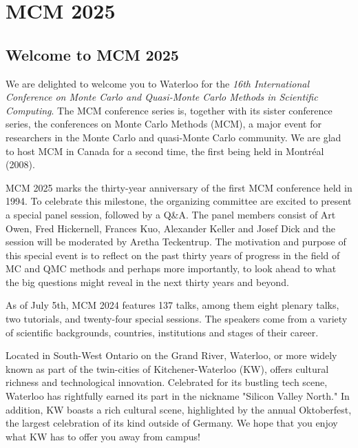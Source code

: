 \chapter{MCM 2025}


\section{Welcome to MCM 2025}

We are delighted to welcome you to Waterloo for the \emph{16th International Conference on Monte Carlo and Quasi-Monte Carlo Methods in Scientific Computing}. The MCM conference series is, together with its sister conference series, the conferences on Monte Carlo Methods (MCM), a major event for researchers in the Monte Carlo and quasi-Monte Carlo community. We are glad to host MCM in Canada for a second time, the first being held in Montr\'{e}al (2008).


MCM 2025 marks the thirty-year anniversary of the first MCM conference held in 1994. To celebrate this milestone, the organizing committee are excited to present a special panel session, followed by a Q\&A. The panel members consist of Art Owen, Fred Hickernell, Frances Kuo, Alexander Keller and Josef Dick and the session will be moderated by Aretha Teckentrup. The motivation and purpose of this special event is to reflect on the past thirty years of progress in the field of MC and QMC methods and perhaps more importantly, to look ahead to what the big questions might reveal in the next thirty years and beyond.

As of July 5th, MCM 2024 features 137 talks, 
among them eight plenary talks, two tutorials, and twenty-four special sessions. 
The speakers come from a variety of scientific backgrounds, countries, institutions and stages of their career. 

Located in South-West Ontario on the Grand River, Waterloo, or more widely known as part of the twin-cities of Kitchener-Waterloo (KW), offers cultural richness and technological innovation. Celebrated for its bustling tech scene, Waterloo has rightfully earned its part in the nickname "Silicon Valley North." In addition, KW boasts a rich cultural scene, highlighted by the annual Oktoberfest, the largest celebration of its kind outside of Germany. We hope that you enjoy what KW has to offer you away from campus!

